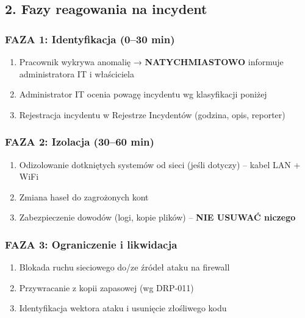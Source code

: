 \documentclass[12pt,a4paper]{article}
\providecommand{\tightlist}{\setlength{\itemsep}{0pt}\setlength{\parskip}{0pt}}
\begin{document}
\subsection{2. Fazy reagowania na
incydent}\label{fazy-reagowania-na-incydent}

\subsubsection{FAZA 1: Identyfikacja (0--30
min)}\label{faza-1-identyfikacja-030-min}

\begin{enumerate}
\tightlist
\item
  Pracownik wykrywa anomalię → \textbf{NATYCHMIASTOWO} informuje
  administratora IT i właściciela
\item
  Administrator IT ocenia powagę incydentu wg klasyfikacji poniżej
\item
  Rejestracja incydentu w Rejestrze Incydentów (godzina, opis, reporter)
\end{enumerate}

\subsubsection{FAZA 2: Izolacja (30--60
min)}\label{faza-2-izolacja-3060-min}

\begin{enumerate}
\tightlist
\item
  Odizolowanie dotkniętych systemów od sieci (jeśli dotyczy) -- kabel
  LAN + WiFi
\item
  Zmiana haseł do zagrożonych kont
\item
  Zabezpieczenie dowodów (logi, kopie plików) -- \textbf{NIE USUWAĆ
  niczego}
\end{enumerate}

\subsubsection{FAZA 3: Ograniczenie i
likwidacja}\label{faza-3-ograniczenie-i-likwidacja}

\begin{enumerate}
\tightlist
\item
  Blokada ruchu sieciowego do/ze źródeł ataku na firewall
\item
  Przywracanie z kopii zapasowej (wg DRP-011)
\item
  Identyfikacja wektora ataku i usunięcie złośliwego kodu
\end{enumerate}
\end{document}
